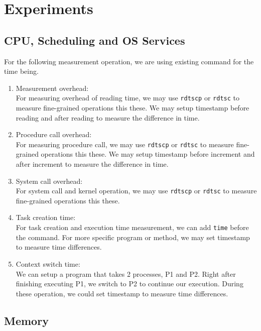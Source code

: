 \section{Experiments}


\subsection{CPU, Scheduling and OS Services}
For the following measurement operation, we are using existing command for the time being.
\begin{enumerate}
	\item Measurement overhead:\\
	For measuring overhead of reading time, we may use \texttt{rdtscp} or \texttt{rdtsc} to measure fine-grained operations this these.
	We may setup timestamp before reading and after reading to measure the difference in time.
	\item Procedure call overhead:\\
	For measuring procedure call, we may use \texttt{rdtscp} or \texttt{rdtsc} to measure fine-grained operations this these.
	We may setup timestamp before increment and after increment to measure the difference in time.
	\item System call overhead:\\
	For system call and kernel operation, we may use \texttt{rdtscp} or \texttt{rdtsc} to measure fine-grained operations this these.
	\item Task creation time:\\
	For task creation and execution time measurement, we can add \texttt{time} before the command. For more specific program or method, we may set timestamp to measure time differences.
	
	\item Context switch time:\\
	We can setup a program that takes 2 processes, P1 and P2. Right after finishing executing P1, we switch to P2 to continue our execution. During these operation, we could set timestamp to measure time differences.
\end{enumerate}

\subsection{Memory}

